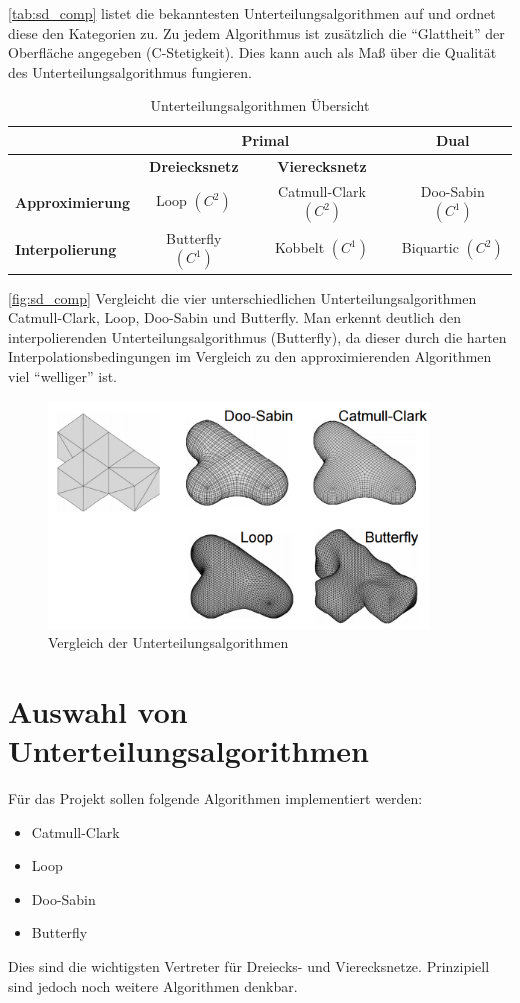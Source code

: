 \autoref{tab:sd_comp} listet die bekanntesten Unterteilungsalgorithmen auf und ordnet diese den Kategorien zu.
Zu jedem Algorithmus ist zusätzlich die \enquote{Glattheit} der Oberfläche angegeben (C-Stetigkeit).
Dies kann auch als Maß über die Qualität des Unterteilungsalgorithmus fungieren.
\begin{table}
\center
\caption{Unterteilungsalgorithmen Übersicht}
\label{tab:sd_comp}
\begin{tabular}{l|c|c|c}
& \multicolumn{2}{c|}{\textbf{Primal}} & \textbf{Dual}\\
\hline
& \textbf{Dreiecksnetz} & \textbf{Vierecksnetz} & \\
\hline
\textbf{Approximierung} & Loop \((C^2)\) & Catmull-Clark \((C^2)\) & Doo-Sabin \((C^1)\) \\
\textbf{Interpolierung} & Butterfly \((C^1)\) & Kobbelt \((C^1)\) & Biquartic \((C^2)\) \\
\end{tabular}
\end{table}
\autoref{fig:sd_comp} Vergleicht die vier unterschiedlichen Unterteilungsalgorithmen Catmull-Clark, Loop, Doo-Sabin und Butterfly.
Man erkennt deutlich den interpolierenden Unterteilungsalgorithmus (Butterfly),
da dieser durch die harten Interpolationsbedingungen im Vergleich zu den approximierenden Algorithmen viel \enquote{welliger} ist.
\begin{figure}
  \centering
  \includegraphics[width=0.9\textwidth]{content/media/sd_overview.png}
  \caption{Vergleich der Unterteilungsalgorithmen \cite{Standford.24.07.2015}}
  \label{fig:sd_comp}
\end{figure}

\section{Auswahl von Unterteilungsalgorithmen}

Für das Projekt sollen folgende Algorithmen implementiert werden:
\begin{itemize}
	\item Catmull-Clark
	\item Loop
	\item Doo-Sabin
	\item Butterfly
\end{itemize}
Dies sind die wichtigsten Vertreter für Dreiecks- und Vierecksnetze.
Prinzipiell sind jedoch noch weitere Algorithmen denkbar.


